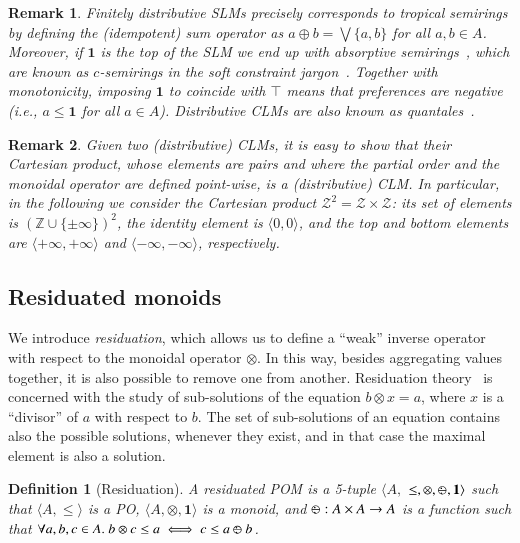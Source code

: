 \documentclass[a4paper]{elsarticle}
\newtheorem{definition}{Definition}
\newtheorem{remark}{Remark}
\newcommand{\1}{\mathbf{1}}
\def\odiv{{ \ominus\hspace{-8pt}:}\;}
\begin{document}
\begin{remark}\label{remTrop}
	Finitely distributive SLMs precisely corresponds to \emph{tropical} semirings 
	by defining the (idempotent) sum operator as
	$a \oplus b = \bigvee \{a, b\}$ for all $a,b \in A$.
	Moreover, if $\1$ is the top of the SLM we end up 
	with \emph{absorptive} semirings~\cite{golan}, 
	which are known as $c$-semirings 
	in the soft constraint jargon~\cite{jacm97}.
	Together with monotonicity, imposing $\1$ to coincide with $\top$ means 
	that preferences are negative (i.e., $a \leq \1$ for all $a \in A$).
	Distributive CLMs are also known as \emph{quantales}~\cite{quantales}.
\end{remark}

\begin{remark}
	\label{remark}
	Given two (distributive) CLMs, it is easy to show that their Cartesian product, whose elements are pairs and where the partial order and the monoidal operator are 
	defined point-wise, is a (distributive) CLM.
	In particular, in the following we consider the Cartesian product $\mathcal{Z}^2 = \mathcal{Z} \times \mathcal{Z}$:
	its set of
	elements is $(\mathbb{Z} \cup \{\pm \infty\})^2$, the identity element is $\langle 0,0 \rangle$,
	and the top and bottom elements are $\langle +\infty, +\infty \rangle$ and $\langle -\infty, -\infty \rangle$, respectively.
\end{remark}

\subsection{Residuated monoids}

We introduce \emph{residuation}, which allows us to define a ``weak'' inverse 
operator with respect to the monoidal operator $\otimes$. 
In this way, besides aggregating values together, it is also possible to remove one from 
another. Residuation theory~\cite{golan} is concerned with the study of sub-solutions of the 
equation $b \otimes x = a$, where $x$ is a ``divisor'' of $a$ with respect to $b$. 
The set of sub-solutions of an equation contains also the 
possible solutions, whenever they exist, and in that case the maximal element is also a 
solution.

\begin{definition}[Residuation]
	A residuated POM is a 5-tuple $\langle A,$ $\leq, \otimes,  \mathbin{\odiv} , \1 \rangle$ such that
	$\langle A, \leq \rangle$ is a PO,  $\langle A, \otimes, \1 \rangle$ is a monoid, and
	$\mathbin{\odiv} : A \times A \rightarrow A$ is a function such that $\forall a, b, c \in A.\ b \otimes c \leq a \iff c \leq a \mathbin{\odiv} b$.
\end{definition}
\end{document}
